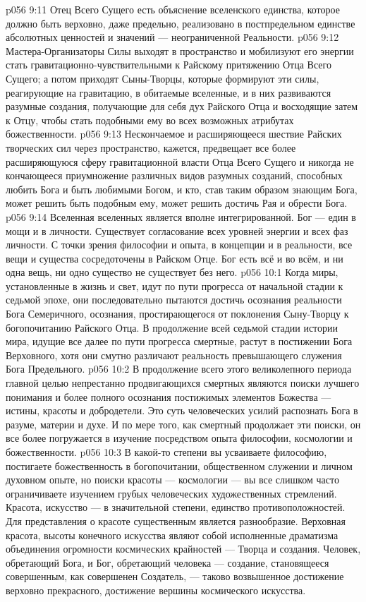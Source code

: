 \vs p056 9:11 Отец Всего Сущего есть объяснение вселенского единства, которое должно быть верховно, даже предельно, реализовано в постпредельном единстве абсолютных ценностей и значений --- неограниченной Реальности.
\vs p056 9:12 Мастера\hyp{}Организаторы Силы выходят в пространство и мобилизуют его энергии стать гравитационно\hyp{}чувствительными к Райскому притяжению Отца Всего Сущего; а потом приходят Сыны\hyp{}Творцы, которые формируют эти силы, реагирующие на гравитацию, в обитаемые вселенные, и в них развиваются разумные создания, получающие для себя дух Райского Отца и восходящие затем к Отцу, чтобы стать подобными ему во всех возможных атрибутах божественности.
\vs p056 9:13 Нескончаемое и расширяющееся шествие Райских творческих сил через пространство, кажется, предвещает все более расширяющуюся сферу гравитационной власти Отца Всего Сущего и никогда не кончающееся приумножение различных видов разумных созданий, способных любить Бога и быть любимыми Богом, и кто, став таким образом знающим Бога, может решить быть подобным ему, может решить достичь Рая и обрести Бога.
\vs p056 9:14 Вселенная вселенных является вполне интегрированной. Бог --- един в мощи и в личности. Существует согласование всех уровней энергии и всех фаз личности. С точки зрения философии и опыта, в концепции и в реальности, все вещи и существа сосредоточены в Райском Отце. Бог есть всё и во всём, и ни одна вещь, ни одно существо не существует без него.
\vs p056 10:1 Когда миры, установленные в жизнь и свет, идут по пути прогресса от начальной стадии к седьмой эпохе, они последовательно пытаются достичь осознания реальности Бога Семеричного, осознания, простирающегося от поклонения Сыну\hyp{}Творцу к богопочитанию Райского Отца. В продолжение всей седьмой стадии истории мира, идущие все далее по пути прогресса смертные, растут в постижении Бога Верховного, хотя они смутно различают реальность превышающего служения Бога Предельного.
\vs p056 10:2 В продолжение всего этого великолепного периода главной целью непрестанно продвигающихся смертных являются поиски лучшего понимания и более полного осознания постижимых элементов Божества --- истины, красоты и добродетели. Это суть человеческих усилий распознать Бога в разуме, материи и духе. И по мере того, как смертный продолжает эти поиски, он все более погружается в изучение посредством опыта философии, космологии и божественности.
\vs p056 10:3 \pc В какой\hyp{}то степени вы усваиваете философию, постигаете божественность в богопочитании, общественном служении и личном духовном опыте, но поиски красоты --- космологии --- вы все слишком часто ограничиваете изучением грубых человеческих художественных стремлений. Красота, искусство --- в значительной степени, единство противоположностей. Для представления о красоте существенным является разнообразие. Верховная красота, высоты конечного искусства являют собой исполненные драматизма объединения огромности космических крайностей --- Творца и создания. Человек, обретающий Бога, и Бог, обретающий человека --- создание, становящееся совершенным, как совершенен Создатель, --- таково возвышенное достижение верховно прекрасного, достижение вершины космического искусства.
